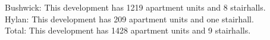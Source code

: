 {Bushwick}: This development has 1219 apartment units and 8 stairhalls.\\{Hylan}: This development has 209 apartment units and one stairhall.\\{Total}: This development has 1428 apartment units and 9 stairhalls.\\